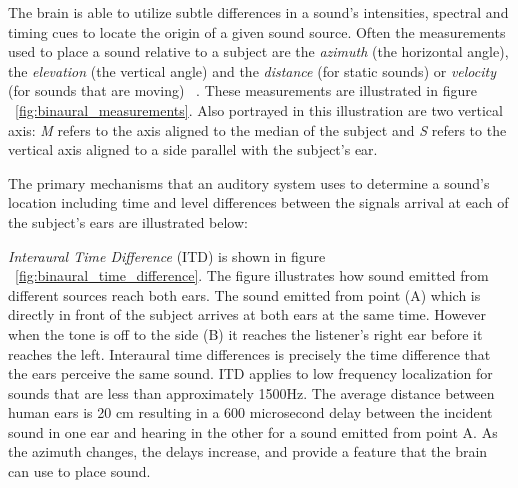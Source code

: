 The brain is able to utilize subtle differences in a sound's intensities,
spectral and timing cues to locate the origin of a given sound source.  Often
the measurements used to place a sound relative to a subject are the
\textit{azimuth} (the horizontal angle), the \textit{elevation} (the vertical
angle) and the \textit{distance} (for static sounds) or \textit{velocity} (for
sounds that are moving) ~\cite{shannan2010audiology}.  These measurements are
illustrated in figure ~\ref{fig:binaural_measurements}.  Also portrayed in this
illustration  are two vertical axis: \textit{M} refers to the axis aligned to
the median of the subject and \textit{S} refers to the vertical axis aligned to
a side parallel with the subject's ear.

The primary mechanisms that an auditory system uses to determine a sound's
location including time and level differences between the signals arrival at
each of the subject's ears  are illustrated below:

\textit{Interaural Time Difference} (ITD) is shown in figure
~\ref{fig:binaural_time_difference}. The figure illustrates how sound emitted
from different sources reach both ears. The sound emitted from point (A) which
is directly in front of the subject arrives at both ears at the same time.
However when the tone is off to the side (B) it reaches the listener's right ear
before it reaches the left. Interaural time differences is precisely the time
difference that the ears perceive the same sound.  ITD applies to low frequency
localization for sounds that are less than approximately 1500Hz.  The average
distance between human ears is 20 cm resulting in a 600 microsecond delay between
the incident sound in one ear and hearing in the other for a sound emitted from
point A.  As the azimuth changes, the delays increase, and provide a feature
that the brain can use to place sound.



